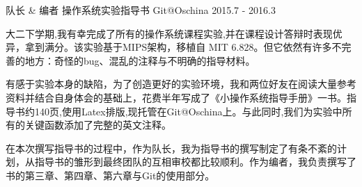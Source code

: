 


\begin{cventries}


\cventry
{队长 \& 编者} %
{操作系统实验指导书} %
{Git@Oschina} %
{2015.7 - 2016.3} %
{ %
\begin{cvitems}
\item {大二下学期,我有幸完成了所有的操作系统课程实验,并在课程设计答辩时表现优异，拿到满分。该实验基于MIPS架构，移植自 MIT 6.828。但它依然有许多不完善的地方：奇怪的bug、混乱的注释与不明确的指导材料。}
\item {有感于实验本身的缺陷，为了创造更好的实验环境，我和两位好友在阅读大量参考资料并结合自身体会的基础上，花费半年写成了《小操作系统指导手册》一书。指导书约140页,使用Latex排版,现托管在Git@Oschina上。与此同时,我们为实验中所有的关键函数添加了完整的英文注释。}
\item {在本次撰写指导书的过程中，作为队长，我为指导书的撰写制定了有条不紊的计划，从指导书的雏形到最终团队的互相审校都比较顺利。作为编者，我负责撰写了书的第三章、第四章、第六章与Git的使用部分。}
\end{cvitems}
}


\end{cventries}
